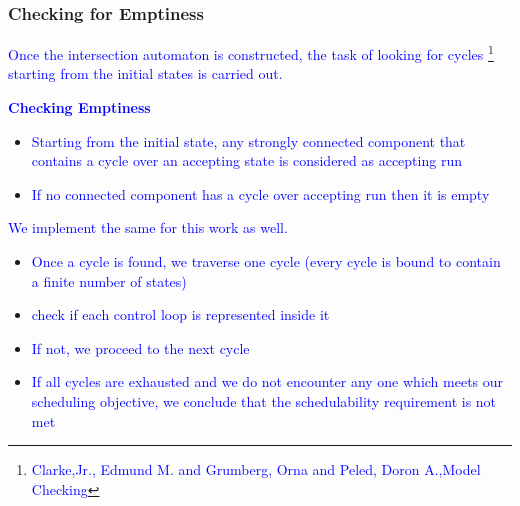 \begin{frame}
\frametitle{Checking for Emptiness}

\tiny{\textcolor{blue}{Once the intersection automaton is constructed, the task of looking for cycles
\footnote{\tiny{\textcolor{blue}{Clarke,Jr., Edmund M. and Grumberg, Orna and Peled, Doron A.,Model Checking}}}
starting from the initial states is carried out.}}

\tiny{\textcolor{blue}{\bf Checking Emptiness}}
\begin{itemize}
 \item \tiny{\textcolor{blue}{Starting from the initial state, any strongly connected component that 
 contains a cycle over an accepting state is considered as accepting run}}
 \item \tiny{\textcolor{blue}{If no connected component has a cycle over accepting run then it is 
       empty}}
       
\end{itemize}



\tiny{\textcolor{blue}{We implement the same for this work as well.}}
\begin{itemize}
\item \tiny{\textcolor{blue}{ Once a cycle is found, we traverse one cycle (every cycle is bound to contain a
finite number of states)}}
\item \tiny{\textcolor{blue}{check if each control loop is represented inside it}}
\item \tiny{\textcolor{blue}{If not, we proceed to the next cycle}}
\item \tiny{\textcolor{blue}{If all cycles are exhausted and we do not encounter any one which meets our scheduling
objective, we conclude that the schedulability requirement is not met}}
\end{itemize}

\end{frame}




